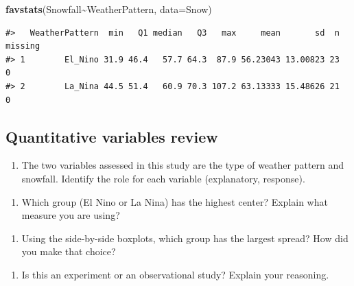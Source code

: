 \documentclass[
]{report}
\newenvironment{Shaded}{\begin{snugshade}}{\end{snugshade}}
\newcommand{\DataTypeTok}[1]{\textcolor[rgb]{0.13,0.29,0.53}{#1}}
\newcommand{\KeywordTok}[1]{\textcolor[rgb]{0.13,0.29,0.53}{\textbf{#1}}}
\newcommand{\NormalTok}[1]{#1}
\newcommand{\OperatorTok}[1]{\textcolor[rgb]{0.81,0.36,0.00}{\textbf{#1}}}
\providecommand{\tightlist}{%
  \setlength{\itemsep}{0pt}\setlength{\parskip}{0pt}}
\begin{document}
\begin{Shaded}
\begin{Highlighting}[]
\KeywordTok{favstats}\NormalTok{(Snowfall}\OperatorTok{\textasciitilde{}}\NormalTok{WeatherPattern, }\DataTypeTok{data=}\NormalTok{Snow)}
\end{Highlighting}
\end{Shaded}

\begin{verbatim}
#>   WeatherPattern  min   Q1 median   Q3   max     mean       sd  n missing
#> 1        El_Nino 31.9 46.4   57.7 64.3  87.9 56.23043 13.00823 23       0
#> 2        La_Nina 44.5 51.4   60.9 70.3 107.2 63.13333 15.48626 21       0
\end{verbatim}

\hypertarget{quantitative-variables-review}{%
\subsection{Quantitative variables review}\label{quantitative-variables-review}}

\begin{enumerate}
\def\labelenumi{\arabic{enumi}.}
\tightlist
\item
  The two variables assessed in this study are the type of weather pattern and snowfall. Identify the role for each variable (explanatory, response).
\end{enumerate}

\vspace{1in}

\begin{enumerate}
\def\labelenumi{\arabic{enumi}.}
\setcounter{enumi}{1}
\tightlist
\item
  Which group (El Nino or La Nina) has the highest center? Explain what measure you are using?
\end{enumerate}

\vspace{1in}

\begin{enumerate}
\def\labelenumi{\arabic{enumi}.}
\setcounter{enumi}{2}
\tightlist
\item
  Using the side-by-side boxplots, which group has the largest spread? How did you make that choice?
\end{enumerate}

\vspace{1in}

\begin{enumerate}
\def\labelenumi{\arabic{enumi}.}
\setcounter{enumi}{3}
\tightlist
\item
  Is this an experiment or an observational study? Explain your reasoning.
\end{enumerate}
\end{document}
